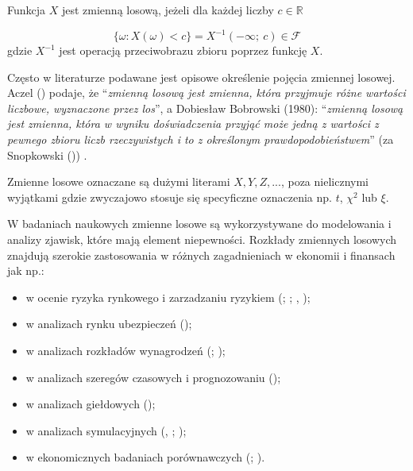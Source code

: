 \documentclass[
  letterpaper,
  DIV=11,
  numbers=noendperiod]{scrreprt}
\begin{document}
Funkcja \(X\) jest zmienną losową, jeżeli dla każdej liczby
\(c \in \mathbb{R}\)

\[ \{{ \omega: X(\omega)<c \}} =X^{-1}(-\infty; \ c)  \in \mathcal{F} \]
gdzie \(X^{-1}\) jest operacją przeciwobrazu zbioru poprzez funkcję
\(X\).

Często w literaturze podawane jest opisowe określenie pojęcia zmiennej
losowej. Aczel () podaje, że
``\emph{zmienną losową jest zmienna, która przyjmuje różne wartości
liczbowe, wyznaczone przez los}'', a Dobiesław Bobrowski (1980):
``\emph{zmienną losową jest zmienna, która w wyniku doświadczenia
przyjąć może jedną z wartości z pewnego zbioru liczb rzeczywistych i to
z określonym prawdopodobieństwem}'' (za Snopkowski
()) .

Zmienne losowe oznaczane są dużymi literami \(X, Y, Z, ...\), poza
nielicznymi wyjątkami gdzie zwyczajowo stosuje się specyficzne
oznaczenia np. \(t\), \(\chi^2\) lub \(\xi\).

W badaniach naukowych zmienne losowe są wykorzystywane do modelowania i
analizy zjawisk, które mają element niepewności. Rozkłady zmiennych
losowych znajdują szerokie zastosowania w różnych zagadnieniach w
ekonomii i finansach jak np.:

\begin{itemize}
\item
  w ocenie ryzyka rynkowego i zarzadzaniu ryzykiem
  (;
  ;
  ,
  );
\item
  w analizach rynku ubezpieczeń ();
\item
  w analizach rozkładów wynagrodzeń (; );
\item
  w analizach szeregów czasowych i prognozowaniu
  ();
\item
  w analizach giełdowych ();
\item
  w analizach symulacyjnych (,
  ;
  );
\item
  w ekonomicznych badaniach porównawczych
  (;
  ).
\end{itemize}
\end{document}

